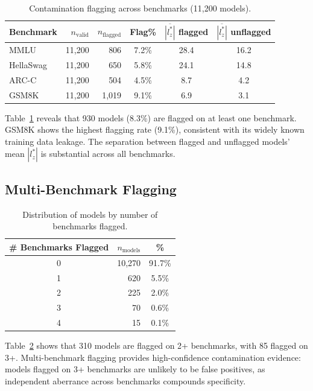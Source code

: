 \documentclass[11pt,a4paper]{article}
\begin{document}
\begin{table}[t]
\centering
\caption{Contamination flagging across benchmarks (11,200 models).}
\label{tab:audit_summary}
\begin{tabular}{lrrccc}
\toprule
Benchmark & $n_{\text{valid}}$ & $n_{\text{flagged}}$ & Flag\% & $\overline{|l_{z}^{*}|}$ flagged & $\overline{|l_{z}^{*}|}$ unflagged \\
\midrule
MMLU & 11,200 & 806 & 7.2\% & 28.4 & 16.2 \\
HellaSwag & 11,200 & 650 & 5.8\% & 24.1 & 14.8 \\
ARC-C & 11,200 & 504 & 4.5\% & 8.7 & 4.2 \\
GSM8K & 11,200 & 1,019 & 9.1\% & 6.9 & 3.1 \\
\bottomrule
\end{tabular}
\end{table}

Table~\ref{tab:audit_summary} reveals that 930 models (8.3\%) are flagged on at least one benchmark.
GSM8K shows the highest flagging rate (9.1\%), consistent with its widely known training data leakage.
The separation between flagged and unflagged models' mean $|l_{z}^{*}|$ is substantial across all benchmarks.

\subsection{Multi-Benchmark Flagging}

\begin{table}[t]
\centering
\caption{Distribution of models by number of benchmarks flagged.}
\label{tab:multi_flag}
\begin{tabular}{crc}
\toprule
\# Benchmarks Flagged & $n_{\text{models}}$ & \% \\
\midrule
0 & 10,270 & 91.7\% \\
1 & 620 & 5.5\% \\
2 & 225 & 2.0\% \\
3 & 70 & 0.6\% \\
4 & 15 & 0.1\% \\
\bottomrule
\end{tabular}
\end{table}

Table~\ref{tab:multi_flag} shows that 310 models are flagged on 2+ benchmarks, with 85 flagged on 3+.
Multi-benchmark flagging provides high-confidence contamination evidence: models flagged on 3+ benchmarks are unlikely to be false positives, as independent aberrance across benchmarks compounds specificity.
\end{document}
